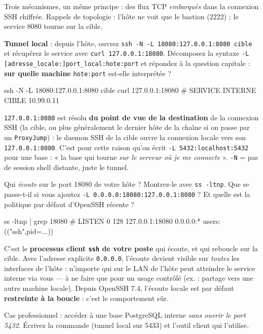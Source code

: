 \documentclass[a4paper,10pt]{exam}
\begin{document}
Trois mécanismes, un même principe : des flux TCP \emph{embarqués} dans la connexion SSH
chiffrée. Rappels de topologie : l'hôte ne voit que le bastion (2222) ; le service 8080
tourne sur la cible.

\begin{questions}
\question \textbf{Tunnel local} : depuis l'hôte, ouvrez
\texttt{ssh -N -L 18080:127.0.0.1:8080 cible} et récupérez le service avec
\texttt{curl 127.0.0.1:18080}. Décomposez la syntaxe \texttt{-L
[adresse\_locale:]port\_local:hote:port} et répondez à la question capitale :
\textbf{sur quelle machine} \texttt{hote:port} est-elle interprétée ?
\begin{solution}
\begin{bashcode}
ssh -N -L 18080:127.0.0.1:8080 cible
curl 127.0.0.1:18080
# SERVICE INTERNE CIBLE 10.99.0.11
\end{bashcode}
\texttt{127.0.0.1:8080} est résolu \textbf{du point de vue de la destination} de la
connexion SSH (la cible, ou plus généralement le dernier hôte de la chaîne si on passe
par un \texttt{ProxyJump}) : le daemon SSH de la cible ouvre la connexion locale vers son
\texttt{127.0.0.1:8080}. C'est pour cette raison qu'on écrit
\texttt{-L 5432:localhost:5432} pour une base : « la base qui tourne \emph{sur le serveur
où je me connecte} ».
\texttt{-N} = pas de session shell distante, juste le tunnel.
\end{solution}
\question Qui \emph{écoute} sur le port 18080 de votre hôte ? Montrez-le avec
\texttt{ss -ltnp}. Que se passe-t-il si vous ajoutez
\texttt{-L 0.0.0.0:18080:127.0.0.1:8080} ? Et quelle est la politique par défaut d'OpenSSH
récente ?
\begin{solution}
\begin{bashcode}
ss -ltnp | grep 18080
# LISTEN  0  128  127.0.0.1:18080  0.0.0.0:*  users:(("ssh",pid=...))
\end{bashcode}
C'est le \textbf{processus client \texttt{ssh} de votre poste} qui écoute, et qui reboucle
sur la cible. Avec l'adresse explicite \texttt{0.0.0.0}, l'écoute devient visible sur
\emph{toutes} les interfaces de l'hôte : n'importe qui sur le LAN de l'hôte peut atteindre
le service interne via vous — à ne faire que pour un usage contrôlé (ex. : partage vers
une autre machine locale). Depuis OpenSSH 7.4, l'écoute locale est par défaut
\textbf{restreinte à la boucle} : c'est le comportement sûr.
\end{solution}
\question Cas professionnel : accéder à une base PostgreSQL interne \emph{sans ouvrir le
port 5432}. Écrivez la commande (tunnel local sur 5433) et l'outil client qui l'utilise.

\end{questions}
\end{document}
